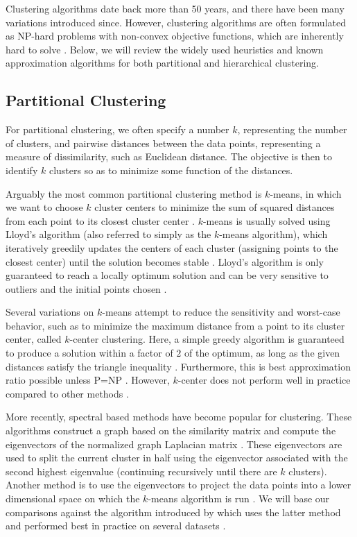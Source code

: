 \documentclass{article}
\begin{document}
Clustering algorithms date back more than 50 years, and there have been many variations introduced since\cite{Jain}. However, clustering algorithms are often formulated as NP-hard problems with non-convex objective functions, which are inherently hard to solve \cite{Jain}.  Below, we will review the widely used heuristics and known approximation algorithms for both partitional and hierarchical clustering.

\subsection{Partitional Clustering}

For partitional clustering, we often specify a number $k$, representing the number of clusters, and pairwise distances between the data points, representing a measure of dissimilarity, such as Euclidean distance.  The objective is then to identify $k$ clusters so as to minimize some function of the distances. 

Arguably the most common partitional clustering method is $k$-means, in which we want to choose $k$ cluster centers to minimize the sum of squared distances from each point to its closest cluster center \cite{Jain}.  $k$-means is usually solved using Lloyd's algorithm (also referred to simply as the $k$-means algorithm), which iteratively greedily updates the centers of each cluster (assigning points to the closest center) until the solution becomes stable \cite{Jain}. Lloyd's algorithm is only guaranteed to reach a locally optimum solution and can be very sensitive to outliers and the initial points chosen \cite{Kanungo}.

Several variations on $k$-means attempt to reduce the sensitivity and worst-case behavior, such as to minimize the maximum distance from a point to its cluster center, called $k$-center clustering. Here, a simple greedy algorithm is guaranteed to produce a solution within a factor of $2$ of the optimum, as long as the given distances satisfy the triangle inequality \cite{Gonzalez}. Furthermore, this is best approximation ratio possible unless P=NP \cite{Shmoys}.  However, $k$-center does not perform well in practice compared to other methods \cite{Murphy}.

More recently, spectral based methods have become popular for clustering. These algorithms construct a graph based on the similarity matrix and compute the eigenvectors of the normalized graph Laplacian matrix \cite{Luxburg}. These eigenvectors are used to split the current cluster in half using the eigenvector associated with the second highest eigenvalue (continuing recursively until there are $k$ clusters).  Another method is to use the eigenvectors to project the data points into a lower dimensional space on which the $k$-means algorithm is run \cite{Verma}. We will base our comparisons against the algorithm introduced by \cite{Meila} which uses the latter method and performed best in practice on several datasets \cite{Verma}.
\end{document}
